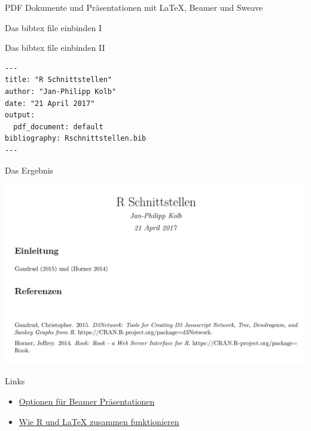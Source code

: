 \documentclass[ignorenonframetext,]{beamer}
\begin{document}
\begin{frame}[fragile]{PDF Dokumente und Präsentationen mit LaTeX,
Beamer und Sweave}
\begin{block}{Das bibtex file einbinden I}
\end{block}

\begin{block}{Das bibtex file einbinden II}

\begin{verbatim}
---
title: "R Schnittstellen"
author: "Jan-Philipp Kolb"
date: "21 April 2017"
output: 
  pdf_document: default
bibliography: Rschnittstellen.bib
---
\end{verbatim}

\end{block}

\begin{block}{Das Ergebnis}

\includegraphics{./tex2pdf.9796/18ffe1b5cd6ac9dbf9c22c41806c1bec1840a90a.png}

\end{block}

\begin{block}{Links}

\begin{itemize}
\item
  \href{http://rmarkdown.rstudio.com/beamer_presentation_format.html}{Optionen
  für Beamer Präsentationen}
\item
  \href{https://www.r-bloggers.com/from-openoffice-noob-to-control-freak-a-love-story-with-r-latex-and-knitr/}{Wie
  R und LaTeX zusammen funktionieren}
\end{itemize}

\end{block}

\end{frame}
\end{document}
